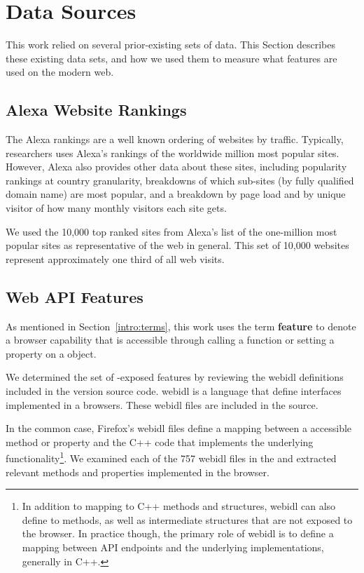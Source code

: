 \section{Data Sources}
\label{measurement:data-sources}

This work relied on several prior-existing sets of data.  This Section
describes these existing data sets, and how we used them to measure what
\JS features are used on the modern web.


\subsection{Alexa Website Rankings}
\label{measurement:data-sources:website-popularity-rankings}
The Alexa rankings are a well known ordering of websites by traffic.
Typically, researchers uses Alexa's rankings of the worldwide million most
popular sites. However, Alexa also provides other data about these sites,
including popularity rankings at country granularity, breakdowns of which
sub-sites (by fully qualified domain name) are most popular, and a breakdown by
page load and by unique visitor of how many monthly visitors each site gets.

We used the 10,000 top ranked sites from Alexa's list of the one-million
most popular sites as representative of the web in general.  This set of 10,000
websites represent approximately one third of all web visits.


\subsection{Web API Features}
\label{measurement:data-sources:method-web-features}
As mentioned in Section~\ref{intro:terms}, this work uses the term
\textbf{feature} to denote a browser capability that is accessible through
calling a \JS function or setting a property on a \JS object.

We determined the set of \JS-exposed features by reviewing the \gls{webidl}
definitions included in the \FF version \FFversion source code. \gls{webidl} is
a language that define \JS interfaces implemented in a browsers.
These \gls{webidl} files are included in the \FF source.

In the common case, Firefox's \gls{webidl} files define a mapping between a
\JS accessible method or property and the C++ code that implements
the underlying functionality\footnote{In addition to mapping
\JS to C++ methods and structures, \gls{webidl} can also define \JS
to \JS methods, as well as intermediate structures that are not
exposed to the browser.  In practice though, the primary role of \gls{webidl}
is to define a mapping between \JS API endpoints and
the underlying implementations, generally in C++.}. We examined each of the 757
\gls{webidl} files in the \FF and extracted \numfeatures relevant methods and
properties implemented in the browser.


